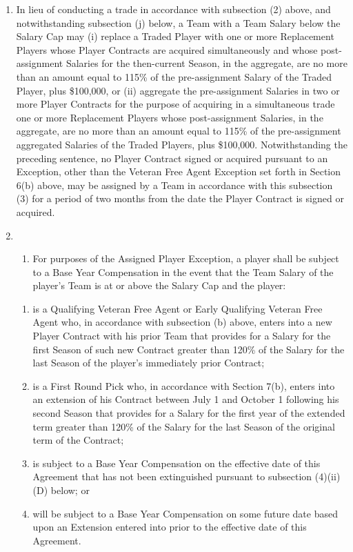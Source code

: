 \documentclass[
]{book}
\providecommand{\tightlist}{%
  \setlength{\itemsep}{0pt}\setlength{\parskip}{0pt}}
\begin{document}
\begin{enumerate}
\begin{enumerate}
  \item
    In lieu of conducting a trade in accordance with subsection (2) above, and notwithstanding subsection (j) below, a Team with a Team Salary below the Salary Cap may (i) replace a Traded Player with one or more Replacement Players whose Player Contracts are acquired simultaneously and whose post-assignment Salaries for the then-current Season, in the aggregate, are no more than an amount equal to 115\% of the pre-assignment Salary of the Traded Player, plus \$100,000, or (ii) aggregate the pre-assignment Salaries in two or more Player Contracts for the purpose of acquiring in a simultaneous trade one or more Replacement Players whose post-assignment Salaries, in the aggregate, are no more than an amount equal to 115\% of the pre-assignment aggregated Salaries of the Traded Players, plus \$100,000. Notwithstanding the preceding sentence, no Player Contract signed or acquired pursuant to an Exception, other than the Veteran Free Agent Exception set forth in Section 6(b) above, may be assigned by a Team in accordance with this subsection (3) for a period of two months from the date the Player Contract is signed or acquired.
  \item
    \begin{enumerate}
    \def\labelenumiii{(\roman{enumiii})}
    \tightlist
    \item
      For purposes of the Assigned Player Exception, a player shall be subject to a Base Year Compensation in the event that the Team Salary of the player's Team is at or above the Salary Cap and the player:
    \end{enumerate}

    \begin{enumerate}
    \def\labelenumiii{(\Alph{enumiii})}
    \tightlist
    \item
      is a Qualifying Veteran Free Agent or Early Qualifying Veteran Free Agent who, in accordance with subsection (b) above, enters into a new Player Contract with his prior Team that provides for a Salary for the first Season of such new Contract greater than 120\% of the Salary for the last Season of the player's immediately prior Contract;
    \item
      is a First Round Pick who, in accordance with Section 7(b), enters into an extension of his Contract between July 1 and October 1 following his second Season that provides for a Salary for the first year of the extended term greater than 120\% of the Salary for the last Season of the original term of the Contract;
    \item
      is subject to a Base Year Compensation on the effective date of this Agreement that has not been extinguished pursuant to subsection (4)(ii)(D) below; or
    \item
      will be subject to a Base Year Compensation on some future date based upon an Extension entered into prior to the effective date of this Agreement.
    \end{enumerate}
  \end{enumerate}


\end{enumerate}
\end{document}

